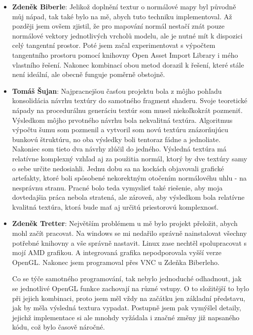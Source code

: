 \documentclass[12pt,a4paper,titlepage,final]{report}
\newcommand\AuthorA{Zdeněk Biberle}
\newcommand\AuthorB{Tomáš Šujan}
\newcommand\AuthorC{Zdeněk Tretter}
\begin{document}
\begin{itemize}
\item \textbf{\AuthorA}: Jelikož doplnění textur o normálové mapy byl původně můj nápad, tak také bylo na mě, abych tuto techniku implementoval. Až později jsem ovšem zjistil, že pro mapování normál nestačí znát pouze normálové vektory jednotlivých vrcholů modelu, ale je nutné mít k dispozici celý tangentní prostor. Poté jsem začal experimentovat s výpočtem tangentního prostoru pomocí knihovny Open Asset Import Library i mého vlastního řešení. Nakonec kombinací obou metod dorazil k řešení, které stále není ideální, ale obecně funguje poměrně obstojně.
\item \textbf{\AuthorB}: Najpracnejšou časťou projektu bola z môjho pohľadu konsolidácia návrhu textúry do samotného fragment shaderu. Svoje teoretické nápady na procedurálnu generáciu textúr som musel niekoľkokrát pozmeniť. Výsledkom môjho prvotného návrhu bola nekvalitná textúra.  Algoritmus výpočtu šumu som pozmenil a vytvoril som novú textúru znázorňujúcu bunkovú štruktúru, no oba výsledky boli tentoraz fádne a jednoliate. Nakoniec som tieto dva návrhy zlúčil do jedného. Výsledná textúra má relatívne komplexný vzhľad aj za použitia normál, ktorý by dve textúry samy o sebe určite nedosiahli. Jednu dobu sa na kockách objavovali grafické artefakty, ktoré boli spôsobené nekorektným otočením normálovéhu uhlu - na nesprávnu stranu. Pracné bolo teda vymyslieť také riešenie, aby moja dovtedajšia práca nebola stratená, ale zároveň, aby výsledkom bola relatívne kvalitná textúra, ktorá bude mať aj určitú priestorovú komplexnosť.
\item \textbf{\AuthorC}: Největším problémem u mě bylo projekt přeložit, abych mohl začít pracovat. Na windows se mi nedařilo správně nainstalovat všechny potřebné knihovny a vše správně nastavit. Linux zase nechtěl spolupracovat s mojí AMD grafikou. A integrovaná grafika nepodporovala vyšší verze OpenGL. Nakonec jsem programoval přes VNC u Zdeňka Biberleho. 

Co se týče samotného programování, tak nebylo jednoduché odhadnout, jak se jednotlivé OpenGL funkce zachovají na různé vstupy. O to složitější to bylo při jejich kombinaci, proto jsem měl vždy na začátku jen základní představu, jak by měla výsledná textura vypadat. Postupně jsem pak vymýšlel detaily, jejichž implementace si ale mnohdy vyžádala i značné změny již napsaného kódu, což bylo časově náročné. 

\end{itemize}
\end{document}
